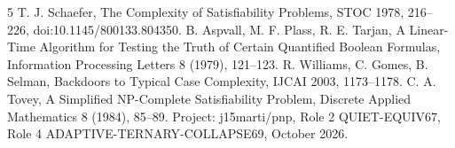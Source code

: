 \documentclass[11pt]{article}
\begin{document}
\begin{thebibliography}{5}
 T. J. Schaefer, The Complexity of Satisfiability
Problems, STOC 1978, 216--226, doi:10.1145/800133.804350.
 B. Aspvall, M. F. Plass, R. E. Tarjan,
A Linear-Time Algorithm for Testing the Truth of Certain Quantified
Boolean Formulas, Information Processing Letters 8 (1979), 121--123.
 R. Williams, C. Gomes, B. Selman,
Backdoors to Typical Case Complexity, IJCAI 2003, 1173--1178.
 C. A. Tovey, A Simplified NP-Complete
Satisfiability Problem, Discrete Applied Mathematics 8 (1984), 85--89.
 Project: j15marti/pnp, Role 2 QUIET-EQUIV67,
Role 4 ADAPTIVE-TERNARY-COLLAPSE69, October 2026.
\end{thebibliography}
\end{document}
